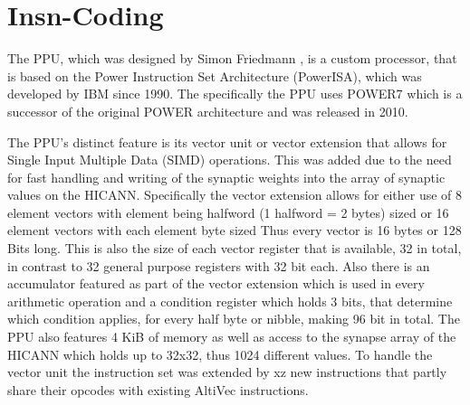 \chapter{Insn-Coding}
\label{chapter:insn coding}

The PPU, which was designed by Simon Friedmann , is a custom processor, that is based on the Power Instruction Set Architecture (PowerISA), which was developed by IBM since 1990. The specifically the PPU uses POWER7 which is a successor of the original POWER architecture and was released in 2010.

The PPU's distinct feature is its vector unit or vector extension that allows for Single Input Multiple Data (SIMD) operations.
This was added due to the need for fast handling and writing of the synaptic weights into the array of synaptic values on the HICANN.
Specifically the vector extension allows for either use of 8 element vectors with element being halfword (1 halfword = 2 bytes) sized or 16 element vectors with each element byte sized
Thus every vector is 16 bytes or 128 Bits long.
This is also the size of each vector register that is available, 32 in total, in contrast to 32 general purpose registers with 32 bit each.
Also there is an accumulator featured as part of the vector extension which is used in every arithmetic operation and a condition register which holds 3 bits, that determine which condition applies, for every half byte or nibble, making 96 bit in total.
The PPU also features 4 KiB of memory as well as access to the synapse array of the HICANN which holds up to 32x32, thus 1024 different values.
To handle the vector unit the instruction set was extended by xz  new instructions that partly share their opcodes with existing AltiVec instructions.

